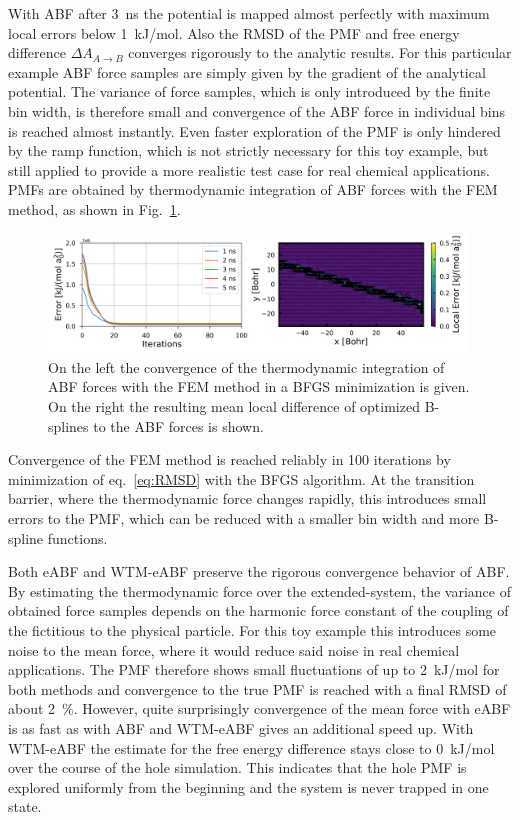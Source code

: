 With ABF after 3~ns the potential is mapped almost perfectly with maximum local errors below 1~kJ/mol. Also the RMSD of the PMF and free energy difference $\Delta A_{A\to B}$ converges rigorously to the analytic results.
For this particular example ABF force samples are simply given by the gradient of the analytical potential.
The variance of force samples, which is only introduced by the finite bin width, is therefore small and convergence of the ABF force in individual bins is reached almost instantly.
Even faster exploration of the PMF is only hindered by the ramp function, which is not strictly necessary for this toy example, but still applied to provide a more realistic test case for real chemical applications.
PMFs are obtained by thermodynamic integration of ABF forces with the FEM method, as shown in Fig.~\ref{fig:ti}.
\begin{figure}[H]
  \centering
  \includegraphics[width=0.99\textwidth]{bilder/test_2D/ti}
  \caption{On the left the convergence of the thermodynamic integration of ABF forces with the FEM method in a BFGS minimization is given. On the right the resulting mean local difference of optimized B-splines to the ABF forces is shown.}
\label{fig:ti}%
\end{figure}
Convergence of the FEM method is reached reliably in 100 iterations by minimization of eq.~\ref{eq:RMSD} with the BFGS algorithm.
At the transition barrier, where the thermodynamic force changes rapidly, this introduces small errors to the PMF, which can be reduced with a smaller bin width and more B-spline functions.

Both eABF and WTM-eABF preserve the rigorous convergence behavior of ABF.
By estimating the thermodynamic force over the extended-system, the variance of obtained force samples depends on the harmonic force constant of the coupling of the fictitious to the physical particle.
For this toy example this introduces some noise to the mean force, where it would reduce said noise in real chemical applications.\autocite{lesage2017smoothed}
The PMF therefore shows small fluctuations of up to 2~kJ/mol for both methods and convergence to the true PMF is reached with a final RMSD of about 2~\%.
However, quite surprisingly convergence of the mean force with eABF is as fast as with ABF and WTM-eABF gives an additional speed up.
With WTM-eABF the estimate for the free energy difference stays close to 0~kJ/mol over the course of the hole simulation.
This indicates that the hole PMF is explored uniformly from the beginning and the system is never trapped in one state.

